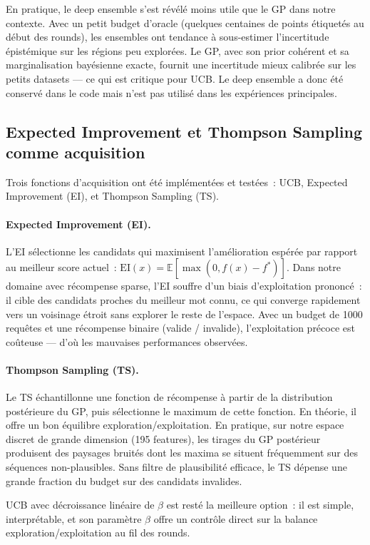 \documentclass[10pt]{article}
\begin{document}
En pratique, le deep ensemble s'est révélé moins utile que le GP dans notre contexte. Avec un petit budget d'oracle (quelques centaines de points étiquetés au début des rounds), les ensembles ont tendance à sous-estimer l'incertitude épistémique sur les régions peu explorées. Le GP, avec son prior cohérent et sa marginalisation bayésienne exacte, fournit une incertitude mieux calibrée sur les petits datasets — ce qui est critique pour UCB. Le deep ensemble a donc été conservé dans le code mais n'est pas utilisé dans les expériences principales.

\subsection{Expected Improvement et Thompson Sampling comme acquisition}

Trois fonctions d'acquisition ont été implémentées et testées~: UCB, Expected Improvement (EI), et Thompson Sampling (TS).

\paragraph{Expected Improvement (EI).}
L'EI sélectionne les candidats qui maximisent l'amélioration espérée par rapport au meilleur score actuel~: $\text{EI}(x) = \mathbb{E}[\max(0, f(x) - f^*)]$. Dans notre domaine avec récompense sparse, l'EI souffre d'un biais d'exploitation prononcé~: il cible des candidats proches du meilleur mot connu, ce qui converge rapidement vers un voisinage étroit sans explorer le reste de l'espace. Avec un budget de 1000 requêtes et une récompense binaire (valide / invalide), l'exploitation précoce est coûteuse — d'où les mauvaises performances observées.

\paragraph{Thompson Sampling (TS).}
Le TS échantillonne une fonction de récompense à partir de la distribution postérieure du GP, puis sélectionne le maximum de cette fonction. En théorie, il offre un bon équilibre exploration/exploitation. En pratique, sur notre espace discret de grande dimension (195 features), les tirages du GP postérieur produisent des paysages bruités dont les maxima se situent fréquemment sur des séquences non-plausibles. Sans filtre de plausibilité efficace, le TS dépense une grande fraction du budget sur des candidats invalides.

UCB avec décroissance linéaire de $\beta$ est resté la meilleure option~: il est simple, interprétable, et son paramètre $\beta$ offre un contrôle direct sur la balance exploration/exploitation au fil des rounds.
\end{document}
